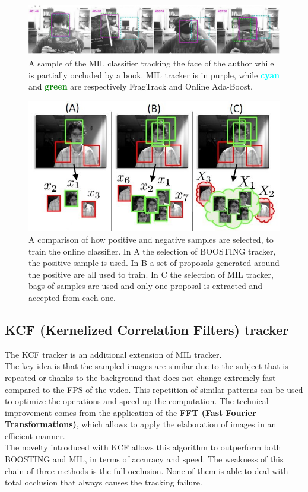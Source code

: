 \begin{figure}[!h]
	\centering
	\includegraphics[width=1\linewidth]{images/tracking/sample_MIL}
	\captionsetup{margin=0.5cm}
	\caption[Examples of partial occlusion tracking.]{A sample of the MIL classifier tracking the face of the author while is partially occluded by a book. MIL tracker is in purple, while \textbf{\textcolor{cyan}{cyan}} and \textbf{\textcolor{green}{green}} are respectively FragTrack\cite{fragTrack} and Online Ada-Boost\cite{onlineAdaBoostTracker}.}
	\label{fig:sample_MIL}
\end{figure}
\begin{figure}[!h]
	\centering
	\includegraphics[width=0.8\linewidth]{images/tracking/howItWorks_MIL}
	\captionsetup{margin=0.5cm}
	\caption[The bag of bounding boxes introduced as MIL novelty.]{A comparison of how positive and negative samples are selected, to train the online classifier. In A the selection of BOOSTING tracker, the positive sample is used. In B a set of proposals generated around the positive are all used to train. In C the selection of MIL tracker, bags of samples are used and only one proposal is extracted and accepted from each one.}
	\label{fig:howItWorks_MIL}
\end{figure}


\subsection{KCF (Kernelized Correlation Filters) tracker} \label{sec:kcf}
The KCF tracker\cite{kcf}\cite{kcf-withColor} is an additional extension of MIL tracker.\\
The key idea is that the sampled images are similar due to the subject that is repeated or thanks to the background that does not change extremely fast compared to the FPS of the video. This repetition of similar patterns can be used to optimize the operations and speed up the computation. The technical improvement comes from the application of the \textbf{FFT (Fast Fourier Transformations)}, which allows to apply the elaboration of images in an efficient manner.\\
The novelty introduced with KCF allows this algorithm to outperform both BOOSTING and MIL, in terms of accuracy and speed. The weakness of this chain of three methods is the full occlusion. None of them is able to deal with total occlusion that always causes the tracking failure.


